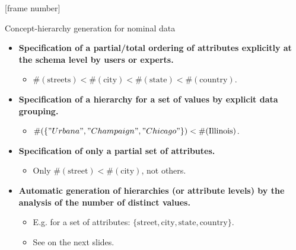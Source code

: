 \documentclass[aspectratio=169,t]{beamer}
\begin{document}
  {
    [frame number]
    \begin{frame}{Concept-hierarchy generation for nominal data}
        \begin{itemize}
            \item \textbf{Specification of a partial/total ordering of attributes explicitly at the schema level by users or experts.}
            \begin{itemize}
              \item $\#(\text{streets}) < \#(\text{city}) < \#(\text{state}) < \#(\text{country})$.
            \end{itemize}
            \item \textbf{Specification of a hierarchy for a set of values by explicit data grouping.}
            \begin{itemize}
              \item $\#(\{"Urbana", "Champaign", "Chicago"\}) < \#(\text{Illinois})$.
            \end{itemize}
            \item \textbf{Specification of only a partial set of attributes.}
            \begin{itemize}
              \item Only $\#(\text{street}) < \#(\text{city})$, not others.
            \end{itemize}
            \item \textbf{Automatic generation of hierarchies (or attribute levels) by the analysis of the number of distinct values.}
            \begin{itemize}
              \item E.g. for a set of attributes: $\{\text{street}, \text{city}, \text{state}, \text{country}\}$.
              \item See on the next slides.
            \end{itemize}
        \end{itemize}
    \end{frame}
  }
\end{document}
